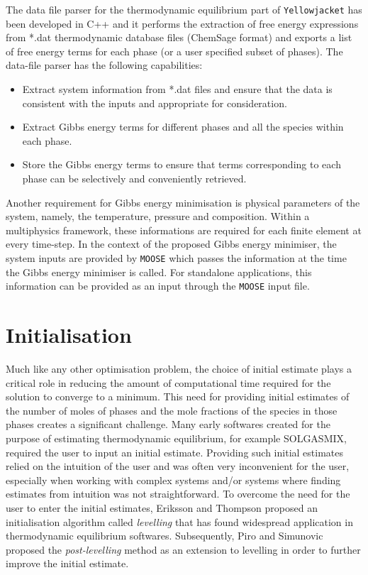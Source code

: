 	The data file parser for the thermodynamic equilibrium part of \texttt{Yellowjacket} has been developed in C++ and it performs the extraction of free energy expressions from *.dat thermodynamic database files (ChemSage format) and exports a list of free energy terms for each phase (or a user specified subset of phases). The data-file parser has the following capabilities:
\begin{itemize}
\itemsep-0.5em
    \item Extract system information from *.dat files and ensure that the data is consistent with the inputs and appropriate for consideration.
    \item Extract Gibbs energy terms for different phases and all the species within each phase.
    \item Store the Gibbs energy terms to ensure that terms corresponding to each phase can be selectively and conveniently retrieved.
\end{itemize}

	Another requirement for Gibbs energy minimisation is physical parameters of the system, namely, the temperature, pressure and composition. Within a multiphysics framework, these informations are required for each finite element at every time-step. In the context of the proposed Gibbs energy minimiser, the system inputs are provided by \texttt{MOOSE} which passes the information at the time the Gibbs energy minimiser is called. For standalone applications, this information can be provided as an input through the \texttt{MOOSE} input file.

\section{Initialisation}
	Much like any other optimisation problem, the choice of initial estimate plays a critical role in reducing the amount of computational time required for the solution to converge to a minimum. This need for providing initial estimates of the number of moles of phases and the mole fractions of the species in those phases creates a significant challenge. Many early softwares  created for the purpose of estimating thermodynamic equilibrium, for example SOLGASMIX, required the user to input an initial estimate. Providing such initial estimates relied on the intuition of the user and was often very inconvenient for the user, especially when working with complex systems and/or systems where finding estimates from intuition was not straightforward.
	To overcome the need for the user to enter the initial estimates,  Eriksson and Thompson \cite{Eriksson89} proposed an initialisation algorithm called \textit{levelling} that has found widespread application in thermodynamic equilibrium softwares. Subsequently, Piro and Simunovic \cite{Piro12a} proposed the \textit{post-levelling} method as an extension to levelling in order to further improve the initial estimate.

